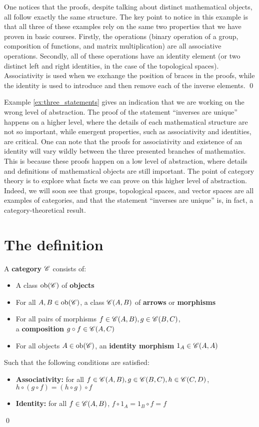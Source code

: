 \documentclass[../thesis.tex]{subfiles}
\begin{document}
\begin{ex}
One notices that the proofs, despite talking about distinct mathematical objects, all follow exactly the same structure.
The key point to notice in this example is that all three of these examples rely on the same two properties that we have proven in basic courses.
Firstly, the operations (binary operation of a group, composition of functions, and matrix multiplication) are all associative operations.
Secondly, all of these operations have an identity element (or two distinct left and right identities, in the case of the topological spaces). 
Associativity is used when we exchange the position of braces in the proofs, while the identity is used to introduce and then remove each of the inverse elements.
\qed
\end{ex}

Example \ref{ex:three_statements} gives an indication that we are working on the wrong level of abstraction.
The proof of the statement ``inverses are unique'' happens on a higher level, where the details of each mathematical structure are not so important, while emergent properties, such as associativity and identities, are critical.
One can note that the proofs for associativity and existence of an identity will vary wildly between the three presented branches of mathematics.
This is because these proofs happen on a low level of abstraction, where details and definitions of mathematical objects are still important.
The point of category theory is to explore what facts we can prove on this higher level of abstraction.
Indeed, we will soon see that groups, topological spaces, and vector spaces are all examples of categories, and that the statement ``inverses are unique'' is, in fact, a category-theoretical result.

\section{The definition}

\begin{defn}
A \textbf{category} $\mathscr{C}$ consists of:
\begin{itemize}
    \item A class $\operatorname{ob}(\mathscr{C})$ of \textbf{objects}
    \item For all $A,B\in\operatorname{ob}(\mathscr{C})$, a class $\mathscr{C}(A,B)$ of \textbf{arrows} or \textbf{morphisms}
    \item For all pairs of morphisms $f\in \mathscr{C}(A,B), g\in \mathscr{C}(B,C)$,\\a \textbf{composition} $g \circ f \in \mathscr{C}(A,C)$
    \item For all objects $A\in \operatorname{ob}(\mathscr{C})$, an \textbf{identity morphism} $1_A \in \mathscr{C}(A,A)$
\end{itemize}
Such that the following conditions are satisfied:
\begin{itemize}
    \item \textbf{Associativity:} for all $f\in \mathscr{C}(A,B),g\in \mathscr{C}(B,C),h\in \mathscr{C}(C,D)$,\\$h\circ (g\circ f)=(h\circ g)\circ f$
    \item \textbf{Identity:} for all $f\in \mathscr{C}(A,B)$, $f\circ 1_A=1_B\circ f=f$
\end{itemize}

\qed
\end{defn}
\end{document}
